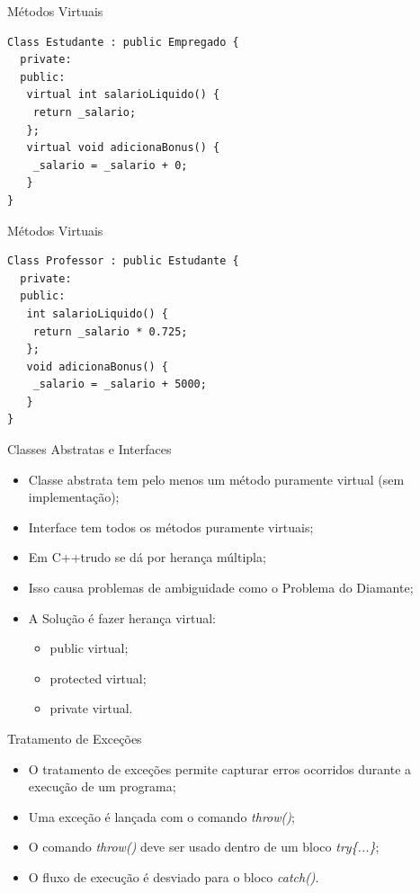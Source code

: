 \documentclass[12pt,table,xcolor={dvipsnames}]{beamer}
\begin{document}
\begin{frame}[fragile]{Métodos Virtuais}
\begin{lstlisting}
Class Estudante : public Empregado {
  private:
  public:
   virtual int salarioLiquido() {
    return _salario;
   };
   virtual void adicionaBonus() {
    _salario = _salario + 0;
   }
}
\end{lstlisting}
\end{frame}

\begin{frame}[fragile]{Métodos Virtuais}
\begin{lstlisting}
Class Professor : public Estudante {
  private:
  public:
   int salarioLiquido() {
    return _salario * 0.725;
   };
   void adicionaBonus() {
    _salario = _salario + 5000;
   }
}
\end{lstlisting}
\end{frame}

\begin{frame}{Classes Abstratas e Interfaces}
\begin{itemize}
\item Classe abstrata tem pelo menos um método puramente virtual (sem implementação);
\item Interface tem todos os métodos puramente virtuais;
\item Em C++trudo se dá por herança múltipla;
\item Isso causa problemas de ambiguidade como o Problema do Diamante;
\item A Solução é fazer herança virtual:
\begin{itemize}
\item public virtual;
\item protected virtual;
\item private virtual.
\end{itemize}
\end{itemize}
\end{frame}

\begin{frame}{Tratamento de Exceções}
\begin{itemize}
\item O tratamento de exceções permite capturar erros ocorridos durante a execução de um programa;
\item Uma exceção é lançada com o comando \textit{throw()};
\item O comando \textit{throw()} deve ser usado dentro de um bloco \textit{try\{...\}};
\item O fluxo de execução é desviado para o bloco \textit{catch()}.
\end{itemize}
\end{frame}
\end{document}
